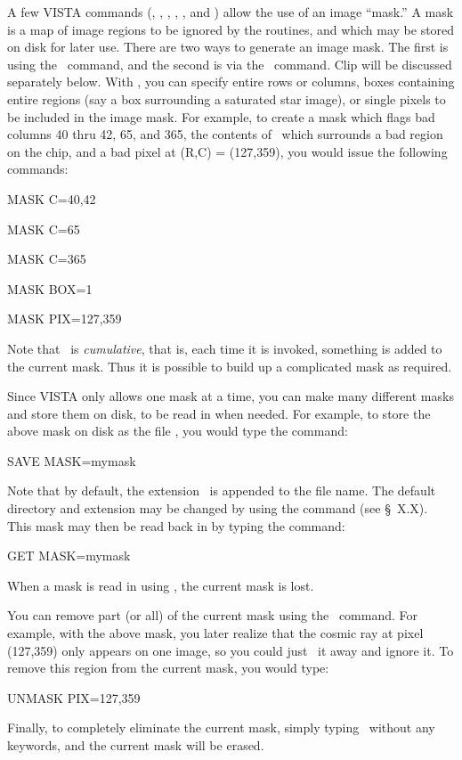 
A few VISTA commands (, , , ,
, and ) allow the use of an image ``mask.''  A
mask is a map of image regions to be ignored by the routines, and which may be
stored on disk for later use.  There are two ways to generate an image mask. 
The first is using the \ command, and the second is via the
\ command.  Clip will be discussed separately below.  With
, you can specify entire rows or columns, boxes containing entire
regions (say a box surrounding a saturated star image), or single pixels to be
included in the image mask.  For example, to create a mask which flags bad
columns 40 thru 42, 65, and 365, the contents of \ which surrounds
a bad region on the chip, and a bad pixel at (R,C) = (127,359), you would
issue the following commands: 
\begin{command}
      \item MASK C=40,42
      \item MASK C=65
      \item MASK C=365
      \item MASK BOX=1
      \item MASK PIX=127,359
\end{command}
Note that \ is {\it cumulative}, that is, each time it is invoked,
something is added to the current mask.  Thus it is possible to build up a
complicated mask as required. 

Since VISTA only allows one mask at a time, you can make many different masks
and store them on disk, to be read in when needed.  For example, to store the
above mask on disk as the file , you would type the command: 
\begin{command}
      \item SAVE MASK=mymask
\end{command}
Note that by default, the extension \ is appended to the file name.
The default directory and extension may be changed by using the 
command (see \S~X.X).  This mask may then be
read back in by typing the command:
\begin{command}
      \item GET MASK=mymask
\end{command}
When a mask is read in using , the current mask is lost.

You can remove part (or all) of the current mask using the \
command.  For example, with the above mask, you later realize that the cosmic
ray at pixel (127,359) only appears on one image, so you could just
\comm{TVZAP}\ it away and ignore it.  To remove this region from the current
mask, you would type: 
\begin{command}
      \item UNMASK PIX=127,359
\end{command}
Finally, to completely eliminate the current mask, simply typing
\comm{UNMASK}\ without any keywords, and the current mask will be erased. 

